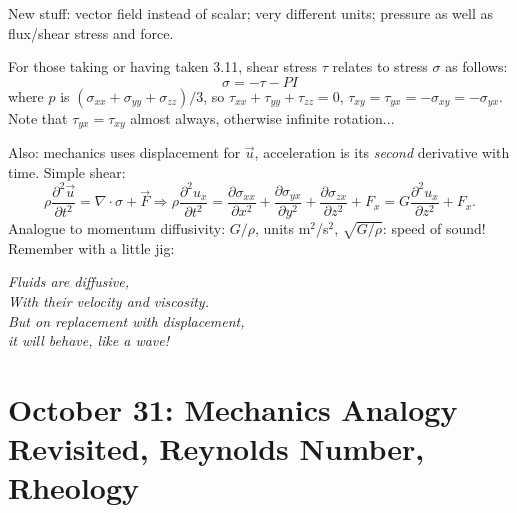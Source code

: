 \documentclass{report}
\begin{document}
New stuff: vector field instead of scalar; very different units; pressure as
well as flux/shear stress and force.

For those taking or having taken 3.11, shear stress $\tau$ relates to stress
$\sigma$ as follows:
$$\sigma = -\tau -PI$$
where $p$ is $(\sigma_{xx}+\sigma_{yy}+\sigma_{zz})/3$, so $\tau_{xx} +
\tau_{yy} + \tau_{zz} = 0$, $\tau_{xy} = \tau_{yx} = -\sigma_{xy} =
-\sigma_{yx}$.  Note that $\tau_{yx} = \tau_{xy}$ almost always, otherwise
infinite rotation...

Also: mechanics uses displacement for $\vec{u}$, acceleration is its {\em
  second} derivative with time.  Simple shear:
$$\rho\frac{\partial^2\vec{u}}{\partial t^2} = \nabla\cdot\sigma + \vec{F}
\Rightarrow \rho\frac{\partial^2u_x}{\partial t^2} =
\frac{\partial\sigma_{xx}}{\partial x^2} + \frac{\partial\sigma_{yx}}{\partial
  y^2} + \frac{\partial\sigma_{zx}}{\partial z^2} + F_x =
G\frac{\partial^2 u_x}{\partial z^2} + F_x.$$
Analogue to momentum diffusivity: $G/\rho$, units m$^2$/s$^2$, $\sqrt{G/\rho}$:
speed of sound!  Remember with a little jig:

\begin{center}
  \em Fluids are diffusive,\\
  With their velocity and viscosity.\\
  But on replacement with displacement,\\
  it will behave, like a wave!
\end{center}
\newpage


\section{October 31: Mechanics Analogy Revisited, Reynolds Number, Rheology}
\end{document}
